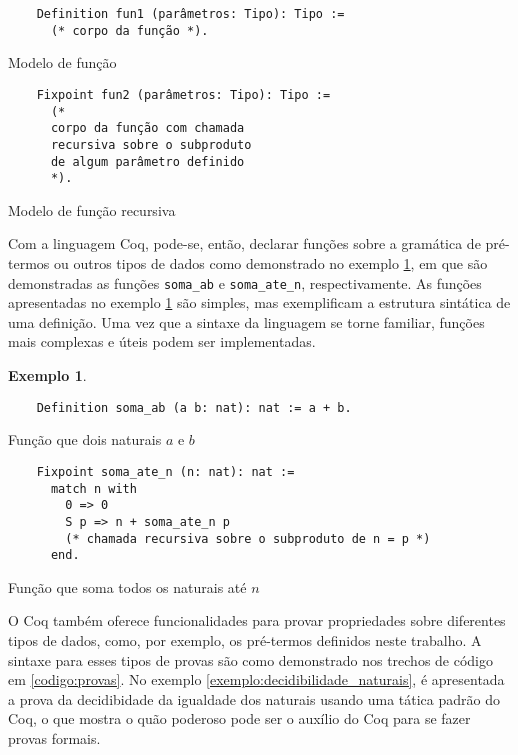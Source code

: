 \documentclass{article}
\newenvironment{codigo}{\captionsetup{type=listing}}{}
\newtheorem{exemplo}{Exemplo}
\begin{document}
\begin{codigo}
\begin{verbatim}
	Definition fun1 (parâmetros: Tipo): Tipo :=
	  (* corpo da função *).
\end{verbatim}
\caption{Modelo de função}
\label{codigo:funcao}
\end{codigo}

\begin{codigo}
\begin{verbatim}
	Fixpoint fun2 (parâmetros: Tipo): Tipo :=
	  (*
	  corpo da função com chamada
	  recursiva sobre o subproduto
	  de algum parâmetro definido
	  *).
\end{verbatim}
\caption{Modelo de função recursiva}
\label{codigo:funcao_recursiva}
\end{codigo}

Com a linguagem Coq, pode-se, então, declarar funções sobre a gramática de pré-termos ou outros tipos
de dados como demonstrado no exemplo \ref{exemplo:funcoes_pre-termos}, em que são demonstradas as
funções \texttt{soma\_ab} e \texttt{soma\_ate\_n}, respectivamente. As funções apresentadas no exemplo
\ref{exemplo:funcoes_pre-termos} são simples, mas exemplificam a estrutura sintática de uma definição.
Uma vez que a sintaxe da linguagem se torne familiar, funções mais complexas e úteis podem ser
implementadas.

\begin{exemplo}
	\label{exemplo:funcoes_pre-termos}
\end{exemplo}
\begin{codigo}
\begin{verbatim}
	Definition soma_ab (a b: nat): nat := a + b.
\end{verbatim}
\caption{Função que dois naturais $a$ e $b$}
\label{codigo:soma_ab}
\end{codigo}

\begin{codigo}
\begin{verbatim}
	Fixpoint soma_ate_n (n: nat): nat :=
	  match n with
		0 => 0
		S p => n + soma_ate_n p
		(* chamada recursiva sobre o subproduto de n = p *)
	  end.
\end{verbatim}
\caption{Função que soma todos os naturais até $n$}
\label{codigo:soma_ate_n}
\end{codigo}

O Coq também oferece funcionalidades para provar propriedades sobre diferentes tipos de dados, como,
por exemplo, os pré-termos definidos neste trabalho. A sintaxe para esses tipos de provas são como
demonstrado nos trechos de código em \ref{codigo:provas}. No exemplo
\ref{exemplo:decidibilidade_naturais}, é apresentada a prova da decidibidade da igualdade dos naturais
usando uma tática padrão do Coq, o que mostra o quão poderoso pode ser o auxílio do Coq para se fazer
provas formais.
\end{document}
